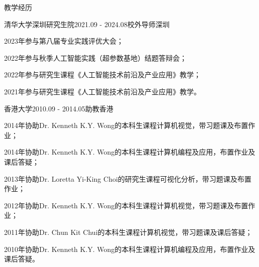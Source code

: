 \documentclass[UTF8]{cv_professional-cn} %
\begin{document}
\begin{rSection}{教学经历}

\begin{rSubsection}{清华大学深圳研究生院}{2021.09 - 2024.08}{校外导师}{深圳}
    \item 2023年参与第八届专业实践评优大会；
    \item 2022年参与秋季人工智能实践（超参数基地）结题答辩会；
    \item 2022年参与研究生课程《人工智能技术前沿及产业应用》教学；
    \item 2021年参与研究生课程《人工智能技术前沿及产业应用》教学。
\end{rSubsection}

\begin{rSubsection}{香港大学}{2010.09 - 2014.05}{助教}{香港}
    \item 2014年协助Dr. Kenneth K.Y. Wong的本科生课程计算机视觉，带习题课及布置作业；
    \item 2014年协助Dr. Kenneth K.Y. Wong的本科生课程计算机编程及应用，布置作业及课后答疑；
    \item 2013年协助Dr. Loretta Yi-King Choi的研究生课程可视化分析，带习题课及布置作业；
    \item 2012年协助Dr. Kenneth K.Y. Wong的本科生课程计算机视觉，带习题课及布置作业；
    \item 2011年协助Dr. Chun Kit Chui的本科生课程计算机视觉，带习题课及课后答疑；
    \item 2010年协助Dr. Kenneth K.Y. Wong的本科生课程计算机编程及应用，布置作业及课后答疑。
\end{rSubsection}

\end{rSection}

\end{document}
